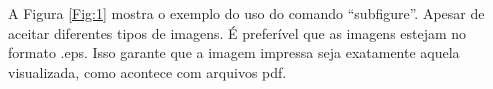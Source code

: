 A Figura \ref{Fig:1} mostra o exemplo do uso do comando ``subfigure''. Apesar de aceitar diferentes tipos de imagens. É preferível que as imagens estejam no formato .eps. Isso garante que a imagem impressa seja exatamente aquela visualizada, como acontece com arquivos pdf.

\centering

